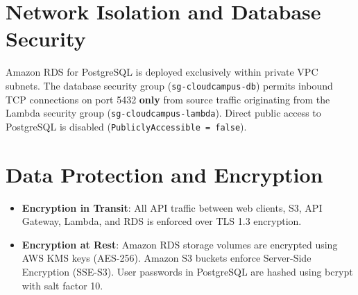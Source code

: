 \section{Network Isolation and Database Security}
Amazon RDS for PostgreSQL is deployed exclusively within private VPC subnets. The database security group (\texttt{sg-cloudcampus-db}) permits inbound TCP connections on port 5432 \textbf{only} from source traffic originating from the Lambda security group (\texttt{sg-cloudcampus-lambda}). Direct public access to PostgreSQL is disabled (\texttt{PubliclyAccessible = false}).

\section{Data Protection and Encryption}
\begin{itemize}
    \item \textbf{Encryption in Transit}: All API traffic between web clients, S3, API Gateway, Lambda, and RDS is enforced over TLS 1.3 encryption.
    \item \textbf{Encryption at Rest}: Amazon RDS storage volumes are encrypted using AWS KMS keys (AES-256). Amazon S3 buckets enforce Server-Side Encryption (SSE-S3). User passwords in PostgreSQL are hashed using bcrypt with salt factor 10.
\end{itemize}
